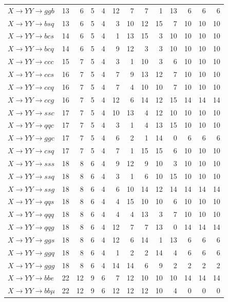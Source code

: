 {\begin{longtable}{l rrrrrrrrrrrr}
$X\to YY\to ggb$ & 13 & 6 & 5 & 4 & 12 & 7 & 7 & 1 & 13 & 6 & 6 & 6 \\
$X\to YY\to bsq$ & 13 & 6 & 5 & 4 & 3 & 10 & 12 & 15 & 7 & 10 & 10 & 10 \\
$X\to YY\to bcs$ & 14 & 6 & 5 & 4 & 1 & 13 & 15 & 3 & 10 & 10 & 10 & 10 \\
$X\to YY\to bcq$ & 14 & 6 & 5 & 4 & 9 & 12 & 3 & 3 & 10 & 10 & 10 & 10 \\
$X\to YY\to ccc$ & 15 & 7 & 5 & 4 & 3 & 1 & 10 & 3 & 6 & 10 & 10 & 10 \\
$X\to YY\to ccs$ & 16 & 7 & 5 & 4 & 7 & 9 & 13 & 12 & 7 & 10 & 10 & 10 \\
$X\to YY\to ccq$ & 16 & 7 & 5 & 4 & 7 & 4 & 10 & 10 & 7 & 10 & 10 & 10 \\
$X\to YY\to ccg$ & 16 & 7 & 5 & 4 & 12 & 6 & 14 & 12 & 15 & 14 & 14 & 14 \\
$X\to YY\to ssc$ & 17 & 7 & 5 & 4 & 10 & 13 & 4 & 12 & 10 & 10 & 10 & 10 \\
$X\to YY\to qqc$ & 17 & 7 & 5 & 4 & 3 & 1 & 4 & 13 & 15 & 10 & 10 & 10 \\
$X\to YY\to ggc$ & 17 & 7 & 5 & 4 & 6 & 2 & 1 & 14 & 0 & 6 & 6 & 6 \\
$X\to YY\to csq$ & 17 & 7 & 5 & 4 & 7 & 1 & 15 & 15 & 6 & 10 & 10 & 10 \\
$X\to YY\to sss$ & 18 & 8 & 6 & 4 & 9 & 12 & 9 & 10 & 3 & 10 & 10 & 10 \\
$X\to YY\to ssq$ & 18 & 8 & 6 & 4 & 3 & 1 & 6 & 10 & 15 & 10 & 10 & 10 \\
$X\to YY\to ssg$ & 18 & 8 & 6 & 4 & 6 & 10 & 14 & 12 & 14 & 14 & 14 & 14 \\
$X\to YY\to qqs$ & 18 & 8 & 6 & 4 & 4 & 15 & 10 & 10 & 6 & 10 & 10 & 10 \\
$X\to YY\to qqq$ & 18 & 8 & 6 & 4 & 4 & 4 & 13 & 3 & 7 & 10 & 10 & 10 \\
$X\to YY\to qqg$ & 18 & 8 & 6 & 4 & 12 & 7 & 7 & 13 & 0 & 14 & 14 & 14 \\
$X\to YY\to ggs$ & 18 & 8 & 6 & 4 & 12 & 6 & 14 & 1 & 13 & 6 & 6 & 6 \\
$X\to YY\to ggq$ & 18 & 8 & 6 & 4 & 1 & 2 & 2 & 14 & 4 & 6 & 6 & 6 \\
$X\to YY\to ggg$ & 18 & 8 & 6 & 4 & 14 & 14 & 6 & 9 & 2 & 2 & 2 & 2 \\
\addlinespace[2pt]
$X\to YY\to bbe$ & 22 & 12 & 9 & 6 & 7 & 12 & 10 & 10 & 10 & 14 & 14 & 14 \\
$X\to YY\to bb\mu$ & 22 & 12 & 9 & 6 & 12 & 12 & 12 & 10 & 4 & 0 & 0 & 0 \\

\end{longtable}}
